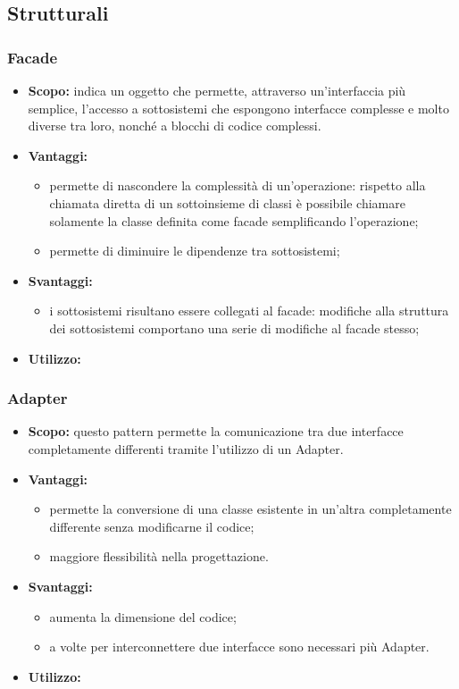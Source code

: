   \subsection{Strutturali}
  
    \subsubsection{Facade}
      \begin{itemize}
       \item \textbf{Scopo:}  indica un oggetto che permette, attraverso un'interfaccia più semplice, l'accesso a sottosistemi che espongono interfacce complesse e molto diverse tra loro, nonché a blocchi di codice complessi. 
	\item \textbf{Vantaggi:}
	  \begin{itemize}
	   \item permette di nascondere la complessità di un'operazione: rispetto alla chiamata diretta di un sottoinsieme di classi è possibile chiamare solamente la classe definita come facade semplificando l'operazione;
	   \item permette di diminuire le dipendenze tra sottosistemi;
	  \end{itemize}
	\item \textbf{Svantaggi:}
	  \begin{itemize}
	   \item i sottosistemi risultano essere collegati al facade: modifiche alla struttura dei sottosistemi comportano una serie di modifiche al facade stesso;
	  \end{itemize}
	\item \textbf{Utilizzo:}
	\end{itemize}
	
    \subsubsection{Adapter}
      \begin{itemize}
       \item \textbf{Scopo:} questo pattern permette la comunicazione tra due interfacce completamente differenti tramite l'utilizzo di un Adapter.
	\item \textbf{Vantaggi:}
	  \begin{itemize}
	   \item permette la conversione di una classe esistente in un'altra completamente differente senza modificarne il codice;
	   \item maggiore flessibilità nella progettazione.
	  \end{itemize}
	\item \textbf{Svantaggi:}
	  \begin{itemize}
	   \item aumenta la dimensione del codice;
	   \item a volte per interconnettere due interfacce sono necessari più Adapter.
	  \end{itemize}
	\item \textbf{Utilizzo:}
	\end{itemize}
	
